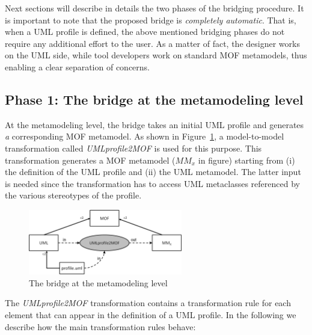 Next sections will describe in details the two phases of the bridging procedure.
It is important to note that the proposed bridge is \textit{completely automatic}. That is, when a UML profile is defined, the above mentioned bridging phases do not require any additional effort to the user. As a matter of fact, the designer works on the UML side, while tool developers work on standard MOF metamodels, thus enabling a clear separation of concerns.


\subsection{Phase 1: The bridge at the metamodeling level}\label{sec:metamodelLevel}

At the metamodeling level, the bridge takes an initial UML profile and generates {\em a} corresponding MOF metamodel.
As shown in Figure~\ref{fig:metamodelingLevel}, a model-to-model transformation called
\textit{UMLprofile2MOF} is used for this purpose. This transformation generates a MOF metamodel ($MM_x$ in figure) starting from (i) the definition of the UML profile and (ii) the UML metamodel. The latter input is needed since the transformation has to access UML metaclasses referenced by the various stereotypes of the profile.

\begin{figure}[htbp]
	\centering
		\includegraphics[width=0.60\textwidth]{figures/metamodelingLevel.png}
	\caption{The bridge at the metamodeling level}
	\label{fig:metamodelingLevel}
\end{figure}


%
The \textit{UMLprofile2MOF} transformation contains a transformation rule for each element that can appear in the definition of a UML profile. In the following we describe how the main transformation rules behave:

